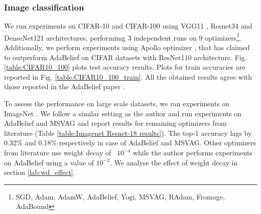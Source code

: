 
\subsubsection{Image classification}
\label{lab:Image_classification}
We run experiments on CIFAR-10 and CIFAR-100 using VGG11 \cite{VGG}, Resnet34 \cite{Resnet} and DenseNet121 \cite{Densenet} architectures, performimg 3 independent runs on 9 optimizers\footnote{\label{fnote:optim_list}SGD, Adam, AdamW, AdaBelief, Yogi, MSVAG, RAdam, Fromage, AdaBound}. Additionally, we perform experiments using Apollo optimizer \cite{Apollo}, that has claimed to outperform AdaBelief on CIFAR datasets with ResNet110 architecture. Fig. \ref{table:CIFAR10_100} plots test accuracy results. Plots for train accuracies are reported in Fig. \ref{table:CIFAR10_100_train}. All the obtained results agree with those reported in the AdaBelief paper \cite{zhuang_adabelief_2020}. 

To assess the performance on large scale datasets, we ran experiments on ImageNet \cite{Imagenet}. We follow a similar setting as the author and run experiments on AdaBelief \cite{zhuang_adabelief_2020} and MSVAG \cite{MSVAG} and report results for remaining optimizers from literature (Table \ref{table:Imagenet Resnet-18 results}). The top-1 accuracy lags by 0.32$\%$ and 0.18$\%$ respectively in case of AdaBelief and MSVAG. 
Other optimizers from literature use weight decay of ~$10^{-4}$ while the author performs experiments on AdaBelief using a value of $10^{-2}$. We analyse the effect of weight decay in section \ref{lab:wd_effect}.




